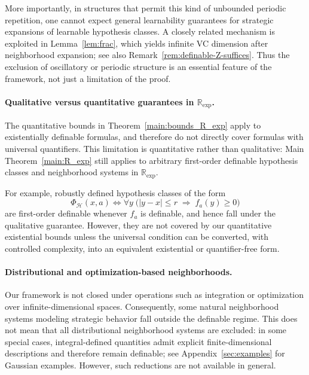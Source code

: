 \documentclass[11pt]{article}
\theoremstyle{plain}
\theoremstyle{definition}
\theoremstyle{remark}
\newcommand{\R}{\mathbb{R}}
\begin{document}
More importantly, in structures that permit this kind of unbounded periodic
repetition, one cannot expect general learnability guarantees for strategic
expansions of learnable hypothesis classes. A closely related mechanism is exploited in
Lemma~\ref{lem:frac}, which yields infinite VC dimension after neighborhood
expansion; see also Remark~\ref{rem:definable-Z-suffices}. Thus the exclusion of
oscillatory or periodic structure is an essential feature of the framework, not
just a limitation of the proof.



\paragraph{Qualitative versus quantitative guarantees in $\R_{\exp}$.}

The quantitative bounds in Theorem~\ref{main:bounds_R_exp} apply to existentially definable formulas, and therefore do not directly cover formulas with
universal quantifiers. This limitation is quantitative rather than qualitative:
Main Theorem~\ref{main:R_exp} still applies to arbitrary first-order definable hypothesis classes and neighborhood systems in $\R_{\exp}$.

For example, robustly defined hypothesis classes of the form
\[
\Phi_{\mathcal H}(x,a)
\Longleftrightarrow
\forall y \;\bigl(|y-x|\le r \;\Rightarrow\; f_a(y)\ge 0\bigr)
\]
are first-order definable whenever \(f_a\) is definable, and hence fall under
the qualitative guarantee. However, they are not covered by our quantitative
existential bounds unless the universal condition can be converted, with
controlled complexity, into an equivalent existential or quantifier-free form.

\paragraph{Distributional and optimization-based neighborhoods.}
Our framework is not closed under operations such as integration or optimization over infinite-dimensional spaces. Consequently, some natural neighborhood systems modeling strategic behavior fall outside the definable regime. This does not mean that all distributional neighborhood systems are excluded: in some special cases, integral-defined quantities admit explicit finite-dimensional descriptions and therefore remain definable; see Appendix~\ref{sec:examples} for Gaussian examples. However, such reductions are not available in general.
\end{document}
